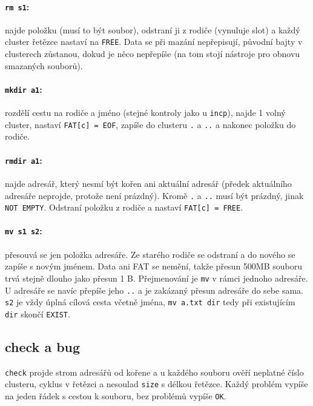 \documentclass[10pt, a4paper]{report}
\newcommand{\code}[1]{\texttt{#1}}
\begin{document}
	\paragraph{\code{rm s1}:} najde položku (musí to být soubor), odstraní ji z rodiče (vynuluje
	slot) a každý cluster řetězce nastaví na \code{FREE}. Data se při mazání nepřepisují, původní
	bajty v clusterech zůstanou, dokud je něco nepřepíše (na tom stojí nástroje pro obnovu
	smazaných souborů).
	
	\paragraph{\code{mkdir a1}:} rozdělí cestu na rodiče a jméno (stejné kontroly jako u
	\code{incp}), najde 1 volný cluster, nastaví \code{FAT[c] = EOF}, zapíše do clusteru \code{.}
	a \code{..} a nakonec položku do rodiče.
	
	\paragraph{\code{rmdir a1}:} najde adresář, který nesmí být kořen ani aktuální adresář (předek
	aktuálního adresáře neprojde, protože není prázdný). Kromě \code{.} a \code{..} musí být prázdný,
	jinak \code{NOT EMPTY}. Odstraní položku z rodiče a nastaví \code{FAT[c] = FREE}.
	
	\paragraph{\code{mv s1 s2}:} přesouvá se jen položka adresáře. Ze starého rodiče se odstraní a
	do nového se zapíše s novým jménem. Data ani FAT se nemění, takže přesun 500MB souboru trvá
	stejně dlouho jako přesun 1 B. Přejmenování je \code{mv} v rámci jednoho adresáře. U adresáře se
	navíc přepíše jeho \code{..} a je zakázaný přesun adresáře do sebe sama. \code{s2} je vždy
	úplná cílová cesta včetně jména, \code{mv a.txt dir} tedy při existujícím \code{dir} skončí
	\code{EXIST}.
	
	\subsection{check a bug}
	
	\code{check} projde strom adresářů od kořene a u každého souboru ověří neplatné číslo clusteru,
	cyklus v řetězci a nesoulad \code{size} s délkou řetězce. Každý problém vypíše na jeden řádek
	s cestou k souboru, bez problémů vypíše \code{OK}.
	
\end{document}
